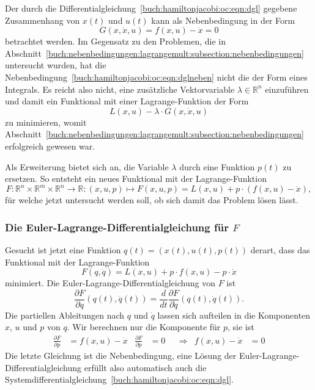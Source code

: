 Der durch die Differentialgleichung~\eqref{buch:hamiltonjacobi:oc:eqn:dgl}
gegebene Zusammenhang von $x(t)$ und $u(t)$ kann als Nebenbedingung 
in der Form
\begin{equation}
G(x,\dot{x}, u)
=
f(x,u) - \dot{x} = 0
\label{buch:hamiltonjacobi:oc:eqn:dglneben}
\end{equation}
betrachtet werden.
Im Gegensatz zu den Problemen, die in
Abschnitt~\ref{buch:nebenbedingungen:lagrangemult:subsection:nebenbedingungen}
untersucht wurden, hat die
Nebenbedingung~\eqref{buch:hamiltonjacobi:oc:eqn:dglneben}
nicht die der Form eines Integrals.
Es reicht also nicht, eine zusätzliche Vektorvariable $\lambda\in\mathbb{R}^n$
einzuführen und damit ein Funktional mit einer Lagrange-Funktion der Form
\[
L(x,u) - \lambda \cdot G(x,\dot{x},u)
\]
zu minimieren, womit
Abschnitt~\ref{buch:nebenbedingungen:lagrangemult:subsection:nebenbedingungen}
erfolgreich gewesen war.

Als Erweiterung bietet sich an, die Variable $\lambda$ durch eine
Funktion $p(t)$ zu ersetzen.
So entsteht ein neues Funktional mit der Lagrange-Funktion
\[
F
\colon
\mathbb{R}^n\times\mathbb{R}^m\times\mathbb{R}^n
\to\mathbb{R}
:
(x,u,p)
\mapsto
F(x,u,p)
=
L(x,u) + p\cdot (f(x,u) - \dot{x}),
\]
für welche jetzt untersucht werden soll, ob sich damit das Problem lösen
lässt.

%
%
\subsubsection{Die Euler-Lagrange-Differentialgleichung für $F$}
Gesucht ist jetzt eine Funktion $q(t)=(x(t),u(t),p(t))$ derart,
dass das Funktional mit der Lagrange-Funktion
\[
F(q,\dot{q})
=
L(x,u) +p\cdot f(x,u) - p\cdot \dot{x}
\]
minimiert.
Die Euler-Lagrange-Differentialgleichung von $F$ ist
\begin{equation}
\frac{\partial F}{\partial q}(q(t),\dot{q}(t))
=
\frac{d}{dt}
\frac{\partial F}{\partial \dot{q}}(q(t),\dot{q}(t)).
\label{buch:hamiltonjacobi:oc:eqn:Feulerlagrange}
\end{equation}
Die partiellen Ableitungen nach $q$ und $\dot{q}$ lassen sich aufteilen
in die Komponenten $x$, $u$ und $p$ von $q$.
Wir berechnen nur die Komponente für $p$, sie ist
\begin{align}
\frac{\partial F}{\partial p}
&=
f(x,u)
-
\dot{x}
&
\frac{\partial F}{\partial \dot{p}}
&=
0
&&\Rightarrow&
f(x,u)-\dot{x}&=0
\label{buch:hamiltonjacobi:oc:eqn:Fsystemdgl}
\end{align}
Die letzte Gleichung ist die Nebenbedingung, eine Lösung der
Euler-Lagrange-Differential\-gleichung erfüllt also automatisch auch die
Systemdifferentialgleichung~\eqref{buch:hamiltonjacobi:oc:eqn:dgl}.

